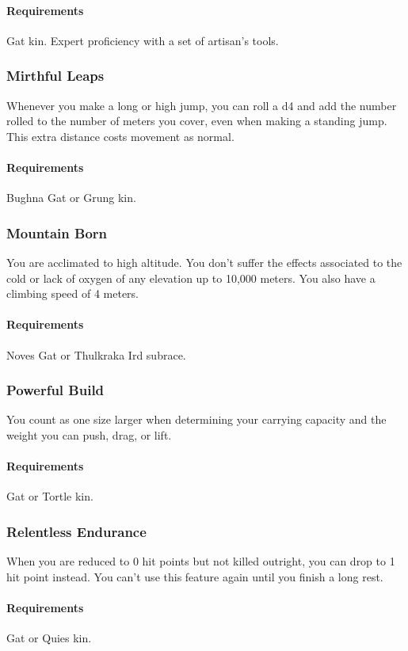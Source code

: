         \paragraph{Requirements} Gat kin. Expert proficiency with a set of artisan's tools.
    \subsubsection{Mirthful Leaps} \label{feat::mirthfulleaps}
        Whenever you make a long or high jump, you can roll a d4 and add the number rolled to the number of meters you cover, even when making a standing jump.
        This extra distance costs movement as normal.
        \paragraph{Requirements} Bughna Gat or Grung kin.
    \subsubsection{Mountain Born} \label{feat::mountainborn}
        You are acclimated to high altitude.
        You don't suffer the effects associated to the cold or lack of oxygen of any elevation up to 10,000 meters.
        You also have a climbing speed of 4 meters.
        \paragraph{Requirements} Noves Gat or Thulkraka Ird subrace.
    \subsubsection{Powerful Build} \label{feat::powerfulbuild_kin}
        You count as one size larger when determining your carrying capacity and the weight you can push, drag, or lift.
        \paragraph{Requirements} Gat or Tortle kin.
    \subsubsection{Relentless Endurance} \label{feat::relentlessendurance}
        When you are reduced to 0 hit points but not killed outright, you can drop to 1 hit point instead.
        You can't use this feature again until you finish a long rest.
        \paragraph{Requirements} Gat or Quies kin.

